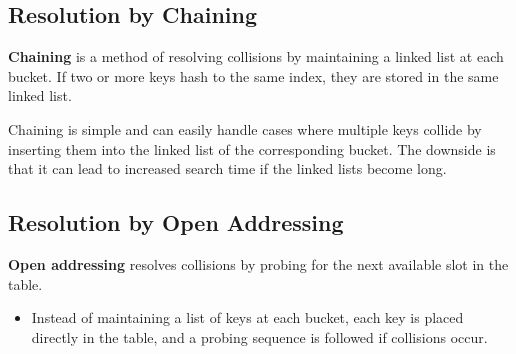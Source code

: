 \subsection{Resolution by Chaining}
\begin{definition}
\textbf{Chaining} is a method of resolving collisions by maintaining a linked list at each bucket. If two or more keys hash to the same index, they are stored in the same linked list.
\end{definition}

\begin{intuition}
Chaining is simple and can easily handle cases where multiple keys collide by inserting them into the linked list of the corresponding bucket. The downside is that it can lead to increased search time if the linked lists become long.
\end{intuition}

\subsection{Resolution by Open Addressing}

\begin{definition}
\textbf{Open addressing} resolves collisions by probing for the next available slot in the table. 
\begin{itemize}
    \item Instead of maintaining a list of keys at each bucket, each key is placed directly in the table, and a probing sequence is followed if collisions occur.
\end{itemize}
\end{definition}

